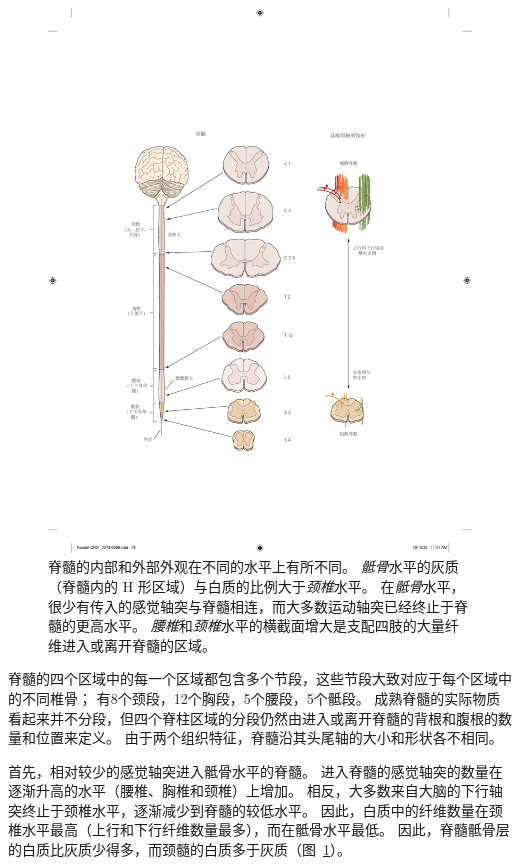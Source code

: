\begin{figure}[htbp]
	\centering
	\includegraphics[width=1.0\linewidth]{chap04/fig_4_4}
	\caption{脊髓的内部和外部外观在不同的水平上有所不同。
		\textit{骶骨}水平的灰质（脊髓内的 H 形区域）与白质的比例大于\textit{颈椎}水平。
		在\textit{骶骨}水平，很少有传入的感觉轴突与脊髓相连，而大多数运动轴突已经终止于脊髓的更高水平。
		\textit{腰椎}和\textit{颈椎}水平的横截面增大是支配四肢的大量纤维进入或离开脊髓的区域。}
	\label{fig:4_4}
\end{figure}


脊髓的四个区域中的每一个区域都包含多个节段，这些节段大致对应于每个区域中的不同椎骨；
有8个颈段，12个胸段，5个腰段，5个骶段。
成熟脊髓的实际物质看起来并不分段，但四个脊柱区域的分段仍然由进入或离开脊髓的背根和腹根的数量和位置来定义。
由于两个组织特征，脊髓沿其头尾轴的大小和形状各不相同。


首先，相对较少的感觉轴突进入骶骨水平的脊髓。
进入脊髓的感觉轴突的数量在逐渐升高的水平（腰椎、胸椎和颈椎）上增加。
相反，大多数来自大脑的下行轴突终止于颈椎水平，逐渐减少到脊髓的较低水平。
因此，白质中的纤维数量在颈椎水平最高（上行和下行纤维数量最多），而在骶骨水平最低。
因此，脊髓骶骨层的白质比灰质少得多，而颈髓的白质多于灰质（图~\ref{fig:4_4}）。


